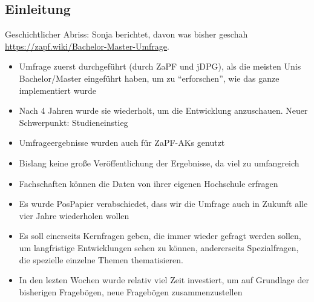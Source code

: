   \subsection*{Einleitung}
    Geschichtlicher Abriss: Sonja berichtet, davon was bisher geschah \url{https://zapf.wiki/Bachelor-Master-Umfrage}. \\
    \begin{itemize}
      \item Umfrage zuerst durchgeführt (durch ZaPF und jDPG), als die meisten Unis Bachelor/Master eingeführt haben, um zu “erforschen”, wie das ganze implementiert wurde
      \item Nach 4 Jahren wurde sie wiederholt, um die Entwicklung anzuschauen. Neuer Schwerpunkt: Studieneinstieg
      \item Umfrageergebnisse wurden auch für ZaPF-AKs genutzt
      \item Bislang keine große Veröffentlichung der Ergebnisse, da viel zu umfangreich
      \item Fachschaften können die Daten von ihrer eigenen Hochschule erfragen
      \item Es wurde PosPapier verabschiedet, dass wir die Umfrage auch in Zukunft alle vier Jahre wiederholen wollen
      \item Es soll einerseits Kernfragen geben, die immer wieder gefragt werden sollen, um langfristige Entwicklungen sehen zu können, andererseits Spezialfragen, die spezielle einzelne Themen thematisieren.
      \item In den lezten Wochen wurde relativ viel Zeit investiert, um auf Grundlage der bisherigen Fragebögen, neue Fragebögen zusammenzustellen
    \end{itemize}

